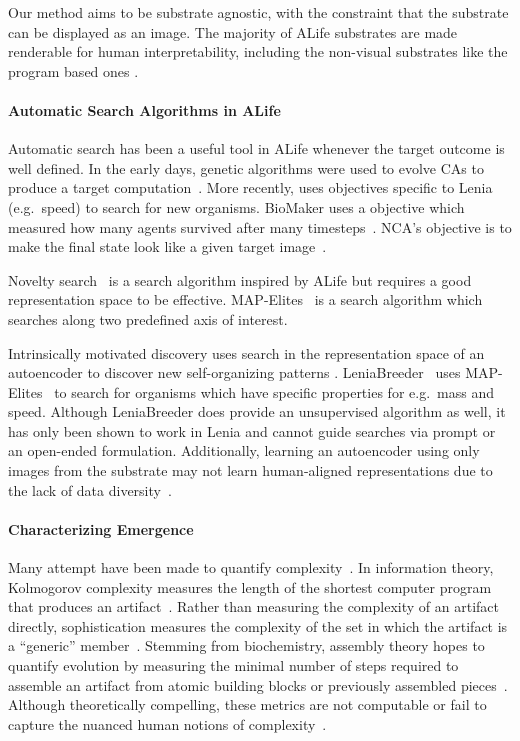 \documentclass{article}
\begin{document}
Our method aims to be substrate agnostic, with the constraint that the substrate can be displayed as an image.
The majority of ALife substrates are made renderable for human interpretability, including the non-visual substrates like the program based ones \citep{alakuijala2024computational}.

\paragraph{Automatic Search Algorithms in ALife}
Automatic search has been a useful tool in ALife whenever the target outcome is well defined.
In the early days, genetic algorithms were used to evolve CAs to produce a target computation~\citep{packard1988adaptation, mitchell1993revisiting}.
More recently, \citet{chan2020lenia} uses objectives specific to Lenia (e.g.\ speed) to search for new organisms.
BioMaker uses a objective which measured how many agents survived after many timesteps~\citep{randazzo2023biomaker}.
NCA's objective is to make the final state look like a given target image~\citep{mordvintsev2020growing}.

Novelty search~\citep{lehman2011abandoning, lehman2011evolving} is a search algorithm inspired by ALife but requires a good representation space to be effective.
MAP-Elites~\citep{mouret2015illuminating} is a search algorithm which searches along two predefined axis of interest.

Intrinsically motivated discovery uses search in the representation space of an autoencoder to discover new self-organizing patterns \citep{reinke2019intrinsically, falk2024curiosity}.
LeniaBreeder~\citep{faldor2024toward} uses MAP-Elites~\citep{mouret2015illuminating} to search for organisms which have specific properties for e.g.\ mass and speed.
Although LeniaBreeder does provide an unsupervised algorithm as well, it has only been shown to work in Lenia and cannot guide searches via prompt or an open-ended formulation.
Additionally, learning an autoencoder using only images from the substrate may not learn human-aligned representations due to the lack of data diversity~\citep{friedman2022vendi}.



\paragraph{Characterizing Emergence}
Many attempt have been made to quantify complexity~\citep{lloyd2001measures, mitchell2009complexity}.
In information theory, Kolmogorov complexity measures the length of the shortest computer program that produces an artifact~\citep{kolmogorov1998tables}.
Rather than measuring the complexity of an artifact directly, sophistication measures the complexity of the set in which the artifact is a ``generic'' member~\citep{mota2013sophistication}.
Stemming from biochemistry, assembly theory hopes to quantify evolution by measuring the minimal number of steps required to assemble an artifact from atomic building blocks or previously assembled pieces~\citep{sharma2023assembly}.
Although theoretically compelling, these metrics are not computable or fail to capture the nuanced human notions of complexity~\citep{lloyd2001measures, karwowski2023goodhart}.
\end{document}
